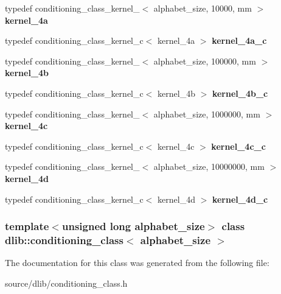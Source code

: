 \begin{DoxyCompactItemize}
\item 
\hypertarget{classdlib_1_1conditioning__class_a2752541f8fb95e288c4922356a128ef4}{
typedef conditioning\_\-class\_\-kernel\_$<$ alphabet\_\-size, 10000, mm $>$ {\bfseries kernel\_\-4a}}
\label{classdlib_1_1conditioning__class_a2752541f8fb95e288c4922356a128ef4}

\item 
\hypertarget{classdlib_1_1conditioning__class_aa06d63b281e56242af65aa990cc48730}{
typedef conditioning\_\-class\_\-kernel\_\-c$<$ kernel\_\-4a $>$ {\bfseries kernel\_\-4a\_\-c}}
\label{classdlib_1_1conditioning__class_aa06d63b281e56242af65aa990cc48730}

\item 
\hypertarget{classdlib_1_1conditioning__class_a661af4f352d54171ff603faf20569031}{
typedef conditioning\_\-class\_\-kernel\_$<$ alphabet\_\-size, 100000, mm $>$ {\bfseries kernel\_\-4b}}
\label{classdlib_1_1conditioning__class_a661af4f352d54171ff603faf20569031}

\item 
\hypertarget{classdlib_1_1conditioning__class_aee6cf5b7f0e5155b50c8619919597330}{
typedef conditioning\_\-class\_\-kernel\_\-c$<$ kernel\_\-4b $>$ {\bfseries kernel\_\-4b\_\-c}}
\label{classdlib_1_1conditioning__class_aee6cf5b7f0e5155b50c8619919597330}

\item 
\hypertarget{classdlib_1_1conditioning__class_a09300657f2de500c9756ac44cc55d395}{
typedef conditioning\_\-class\_\-kernel\_$<$ alphabet\_\-size, 1000000, mm $>$ {\bfseries kernel\_\-4c}}
\label{classdlib_1_1conditioning__class_a09300657f2de500c9756ac44cc55d395}

\item 
\hypertarget{classdlib_1_1conditioning__class_aaa49dd0ab67b10e33d7c7d33777075a9}{
typedef conditioning\_\-class\_\-kernel\_\-c$<$ kernel\_\-4c $>$ {\bfseries kernel\_\-4c\_\-c}}
\label{classdlib_1_1conditioning__class_aaa49dd0ab67b10e33d7c7d33777075a9}

\item 
\hypertarget{classdlib_1_1conditioning__class_aea6478d0c4d6b20179c495f7bf4286ce}{
typedef conditioning\_\-class\_\-kernel\_$<$ alphabet\_\-size, 10000000, mm $>$ {\bfseries kernel\_\-4d}}
\label{classdlib_1_1conditioning__class_aea6478d0c4d6b20179c495f7bf4286ce}

\item 
\hypertarget{classdlib_1_1conditioning__class_aeda54b2b0bd3e3c8bbe6fa4746786193}{
typedef conditioning\_\-class\_\-kernel\_\-c$<$ kernel\_\-4d $>$ {\bfseries kernel\_\-4d\_\-c}}
\label{classdlib_1_1conditioning__class_aeda54b2b0bd3e3c8bbe6fa4746786193}

\end{DoxyCompactItemize}
\subsubsection*{template$<$unsigned long alphabet\_\-size$>$ class dlib::conditioning\_\-class$<$ alphabet\_\-size $>$}



The documentation for this class was generated from the following file:\begin{DoxyCompactItemize}
\item 
source/dlib/conditioning\_\-class.h\end{DoxyCompactItemize}
